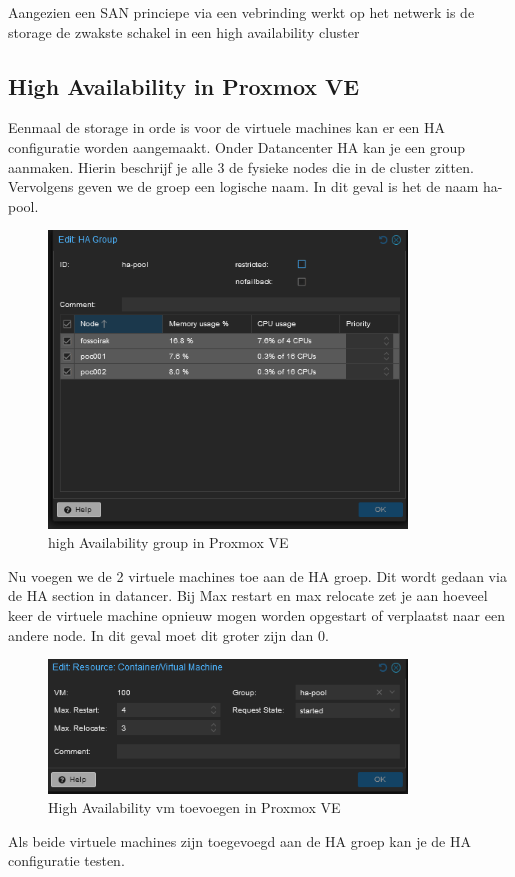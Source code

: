 Aangezien een SAN princiepe via een vebrinding werkt op het netwerk is de storage de zwakste schakel in een high availability cluster
\subsection{High Availability in Proxmox VE}

Eenmaal de storage in orde is voor de virtuele machines kan er een HA configuratie worden aangemaakt. 
Onder Datancenter HA kan je een group aanmaken. Hierin beschrijf je alle 3 de fysieke nodes die in de cluster zitten. Vervolgens geven we de groep een logische naam. In dit geval is het de naam ha-pool.
\begin{figure}[H]
  \centering
  \includegraphics[width=0.85\textwidth]{../poc/ha-group.png}
  \caption{high Availability group in Proxmox VE}
  \label{fig:ha-group}
\end{figure}
Nu voegen we de 2 virtuele machines toe aan de HA groep. Dit wordt gedaan via de HA section in datancer.
Bij Max restart en max relocate zet je aan hoeveel keer de virtuele machine opnieuw mogen worden opgestart of verplaatst naar een andere node. In dit geval moet dit groter zijn dan 0.
\begin{figure}[H]
  \centering
  \includegraphics[width=0.85\textwidth]{../poc/vm-ha.png}
  \caption{High Availability vm toevoegen in Proxmox VE}
  \label{fig:ha-vm}
\end{figure}
Als beide virtuele machines zijn toegevoegd aan de HA groep kan je de HA configuratie testen.

